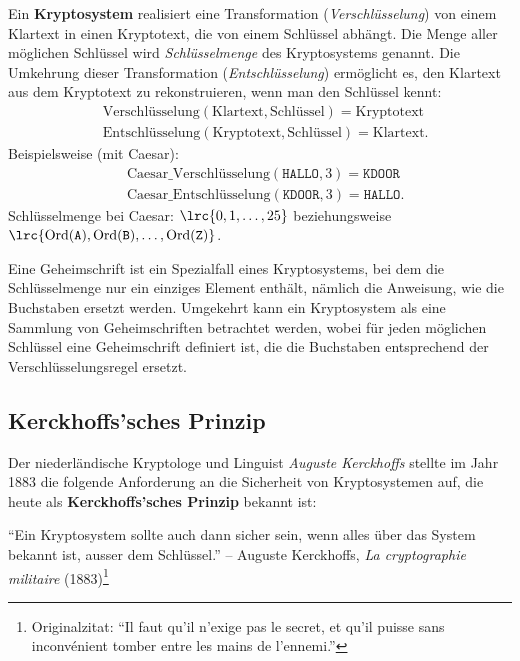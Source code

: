 \begin{mydefinition}[Kryptosystem]\label{mydefinition:kryptosystem}
	Ein \textbf{Kryptosystem} realisiert eine Transformation (\emph{Verschlüsselung}) von einem Klartext in einen Kryptotext, die von einem Schlüssel abhängt.
	Die Menge aller möglichen Schlüssel wird \emph{Schlüsselmenge} des Kryptosystems genannt.
	Die Umkehrung dieser Transformation (\emph{Entschlüsselung}) ermöglicht es, den Klartext aus dem Kryptotext zu rekonstruieren, wenn man den Schlüssel kennt:
	\begin{align*}
		 & \text{Verschlüsselung}(\text{Klartext}, \text{Schlüssel}) = \text{Kryptotext}  \\
		 & \text{Entschlüsselung}(\text{Kryptotext}, \text{Schlüssel}) = \text{Klartext}.
	\end{align*}
	Beispielsweise (mit Caesar):
	\begin{align*}
		 & \text{Caesar\_Verschlüsselung}(\texttt{HALLO}, 3) = \texttt{KDOOR}  \\
		 & \text{Caesar\_Entschlüsselung}(\texttt{KDOOR}, 3) = \texttt{HALLO}.
	\end{align*}
	Schlüsselmenge bei Caesar: $\lrc{0, 1, \dots, 25}$ beziehungsweise $\lrc{\text{Ord}(\texttt{A}), \text{Ord}(\texttt{B}), \dots, \text{Ord}(\texttt{Z})}$.
\end{mydefinition}

\begin{myremark}
	Eine Geheimschrift ist ein Spezialfall eines Kryptosystems, bei dem die Schlüsselmenge nur ein einziges Element enthält, nämlich die Anweisung, wie die Buchstaben ersetzt werden.
	Umgekehrt kann ein Kryptosystem als eine Sammlung von Geheimschriften betrachtet werden, wobei für jeden möglichen Schlüssel eine Geheimschrift definiert ist, die die Buchstaben entsprechend der Verschlüsselungsregel ersetzt.
\end{myremark}

\subsection{Kerckhoffs'sches Prinzip}\label{subsec:kerckhoffs}
Der niederländische Kryptologe und Linguist \emph{Auguste Kerckhoffs} stellte im Jahr 1883 die folgende Anforderung an die Sicherheit von Kryptosystemen auf, die heute als \textbf{Kerckhoffs'sches Prinzip} bekannt ist:

\begin{myquote}\label{myquote:kerckhoffs}
	\enquote{Ein Kryptosystem sollte auch dann sicher sein, wenn alles über das System bekannt ist, ausser dem Schlüssel.} -- Auguste Kerckhoffs, \emph{La cryptographie militaire} (1883)\footnote{Originalzitat: \enquote{Il faut qu'il n'exige pas le secret, et qu'il puisse sans inconvénient tomber entre les mains de l'ennemi.}}
\end{myquote}

